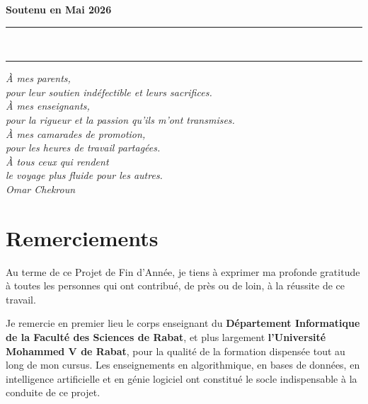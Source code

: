 \documentclass[11pt, a4paper]{article}
\begin{document}
\begin{titlepage}
\begin{center}
\vfill
{\large \textbf{Soutenu en Mai 2026}}\\[0.4cm]
\noindent\rule{\textwidth}{1.2pt}
\vspace{0.05cm}\\
\noindent\rule{\textwidth}{0.4pt}

\end{center}
\end{titlepage}

\newpage
\thispagestyle{empty}
\vspace*{2cm}
\begin{flushright}
\textit{\large À mes parents,}\\[0.2cm]
\textit{pour leur soutien indéfectible et leurs sacrifices.}\\[1cm]

\textit{\large À mes enseignants,}\\[0.2cm]
\textit{pour la rigueur et la passion qu'ils m'ont transmises.}\\[1cm]

\textit{\large À mes camarades de promotion,}\\[0.2cm]
\textit{pour les heures de travail partagées.}\\[1cm]

\textit{\large À tous ceux qui rendent}\\[0.2cm]
\textit{le voyage plus fluide pour les autres.}\\[2cm]

\hfill\textit{Omar Chekroun}
\end{flushright}

\newpage
\thispagestyle{fancy}
\section*{Remerciements}

Au terme de ce Projet de Fin d'Année, je tiens à exprimer ma profonde gratitude
à toutes les personnes qui ont contribué, de près ou de loin, à la réussite de
ce travail.

Je remercie en premier lieu le corps enseignant du \textbf{Département
Informatique de la Faculté des Sciences de Rabat}, et plus largement
\textbf{l'Université Mohammed V de Rabat}, pour la qualité de la formation
dispensée tout au long de mon cursus. Les enseignements en algorithmique,
en bases de données, en intelligence artificielle et en génie logiciel ont
constitué le socle indispensable à la conduite de ce projet.
\end{document}
